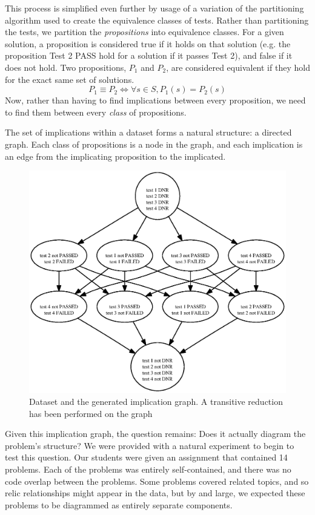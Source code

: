 \documentclass[11pt,twoside]{article}
\begin{document}
This process is simplified even further by usage of a variation of the partitioning algorithm used to create the equivalence classes of tests. Rather than partitioning the tests, we partition the \emph{propositions} into equivalence classes. For a given solution, a proposition is considered true if it holds on that solution (e.g. the proposition Test 2 PASS hold for a solution if it passes Test 2), and false if it does not hold. Two propositions, $P_1$ and $P_2$, are considered equivalent if they hold for the exact same set of solutions.
$$P_1 \equiv P_2 \iff \forall s \in S, P_1(s) = P_2(s)$$
Now, rather than having to find implications between every proposition, we need to find them between every \emph{class} of propositions.

The set of implications within a dataset forms a natural structure: a directed graph. Each class of propositions is a node in the graph, and each implication is an edge from the implicating proposition to the implicated.

\begin{figure}

\includegraphics[scale=0.75]{toyimpl.ps}
\caption{Dataset and the generated implication graph. A transitive reduction has been performed on the graph}
\end{figure}

Given this implication graph, the question remains: Does it actually diagram the problem's structure? We were provided with a natural experiment to begin to test this question. Our students were given an assignment that contained 14 problems. Each of the problems was entirely self-contained, and there was no code overlap between the problems. Some problems covered related topics, and so relic relationships might appear in the data, but by and large, we expected these problems to be diagrammed as entirely separate components.
\end{document}
